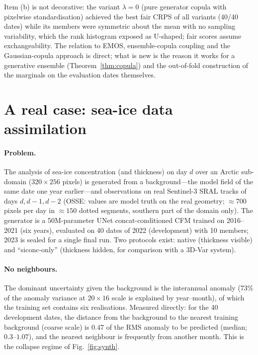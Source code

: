 \documentclass[11pt]{article}
\begin{document}
Item (b) is not decorative: the variant $\lambda=0$ (pure generator copula with pixelwise standardisation) achieved the best fair CRPS of all variants (40/40 dates) while its members were symmetric about the mean with no sampling variability, which the rank histogram exposed as U-shaped; fair scores assume exchangeability. The relation to EMOS, ensemble-copula coupling and the Gaussian-copula approach \citep{gneiting2005emos,schefzik2013ecc,moller2013gca} is direct; what is new is the reason it works for a generative ensemble (Theorem~\ref{thm:copula}) and the out-of-fold construction of the marginals on the evaluation dates themselves.

\section{A real case: sea-ice data assimilation}
\label{sec:ice}
\paragraph{Problem.} The analysis of sea-ice concentration (and thickness) on day $d$ over an Arctic sub-domain ($320\times256$ pixels) is generated from a background---the model field of the same date one year earlier---and observations on real Sentinel-3 SRAL tracks of days $d,d-1,d-2$ (OSSE: values are model truth on the real geometry; $\approx700$ pixels per day in $\approx150$ dotted segments, southern part of the domain only). The generator is a 50M-parameter UNet concat-conditioned CFM trained on 2016--2021 (six years), evaluated on 40 dates of 2022 (development) with 10 members; 2023 is sealed for a single final run. Two protocols exist: native (thickness visible) and ``siconc-only'' (thickness hidden, for comparison with a 3D-Var system).

\paragraph{No neighbours.} The dominant uncertainty given the background is the interannual anomaly (73\% of the anomaly variance at $20\times16$ scale is explained by year--month), of which the training set contains six realisations. Measured directly: for the 40 development dates, the distance from the background to the nearest training background (coarse scale) is $0.47$ of the RMS anomaly to be predicted (median; $0.3$--$1.07$), and the nearest neighbour is frequently from another month. This is the collapse regime of Fig.~\ref{fig:synth}.
\end{document}
